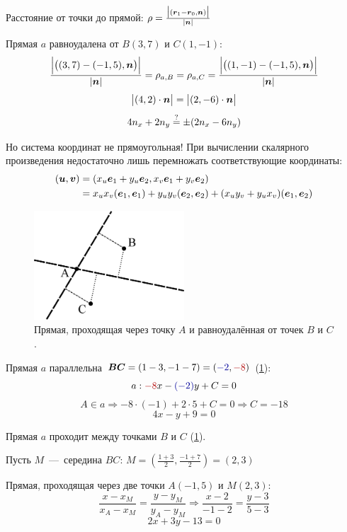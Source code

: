 \documentclass[a4paper,12pt]{article}
\begin{document}
  \begin{solution}
    Расстояние от точки до прямой:
    $\rho = \frac{\bigl|(\boldsymbol r_1 - \boldsymbol r_0, \boldsymbol n)\bigr|}{|\boldsymbol n|}$
    
    Прямая $a$ равноудалена от $B(3, 7)$ и $C(1, -1)$:
    \[
      \frac{\Bigl|\bigl((3, 7) - (-1, 5), \boldsymbol n\bigr)\Bigr|}{|\boldsymbol n|} = \rho_{a, B}
      = \rho_{a, C}
      = \frac{\Bigl|\bigl((1, -1) - (-1, 5), \boldsymbol n\bigr)\Bigr|}{|\boldsymbol n|}
    \]
    \[
      \bigl|(4, 2) \cdot \boldsymbol n\bigr| = \bigl|(2, -6) \cdot \boldsymbol n\bigr|
    \]
    \[
      4 n_x + 2 n_y \stackrel{\operatorname{?}}{=} \pm(2 n_x - 6 n_y)
    \]
    
    Но система координат не прямоугольная! При вычислении скалярного произведения недостаточно лишь перемножать соответствующие координаты:
    \begin{equation*}
    \begin{split}
      (\boldsymbol u, \boldsymbol v)
      &= (x_u \boldsymbol e_1 + y_u \boldsymbol e_2, x_v \boldsymbol e_1 + y_v \boldsymbol e_2)\\
      &= x_u x_v(\boldsymbol e_1, \boldsymbol e_1) + y_u y_v(\boldsymbol e_2, \boldsymbol e_2) + (x_u y_v + y_u x_v)(\boldsymbol e_1, \boldsymbol e_2)
    \end{split}
    \end{equation*}

    \begin{figure}[h]
      \centering
      
      \includegraphics[width=0.5\textwidth]{5-19}
      
      \caption{Прямая, проходящая через точку $A$ и равноудалённая от точек $B$ и $C$.}
      \label{fig:5-19}
    \end{figure}
    
    Прямая $a$ параллельна $\bds{BC} \hm= (1 - 3, -1 - 7) \hm= (\textcolor{my-blue}{-2}, \textcolor{my-red}{-8})$ (\ref{fig:5-19}):
    \[
      a: \textcolor{my-red}{-8} x - \textcolor{my-blue}{(-2)} y + C = 0
    \]
    \[
      A \in a \Rightarrow -8 \cdot (-1) + 2 \cdot 5 + C = 0 \Rightarrow C = -18
    \]
    \[
      \boxed{4x - y + 9 = 0}
    \]
      
    Прямая $a$ проходит между точками $B$ и $C$ (\ref{fig:5-19}).
    
    Пусть $M$~---~середина $BC$:
    $
      M = \left(\frac{1 + 3}{2}, \frac{-1 + 7}{2}\right) = (2, 3)
    $
    
    Прямая, проходящая через две точки $A(-1, 5)$ и $M(2, 3)$:
    \[
      \frac{x - x_M}{x_A - x_M} = \frac{y - y_M}{y_A - y_M}
      \Rightarrow
      \frac{x - 2}{-1 - 2} = \frac{y - 3}{5 - 3}
    \]
    \[
      \boxed{2x + 3y - 13 = 0}
    \]
  \end{solution}
  
\end{document}
